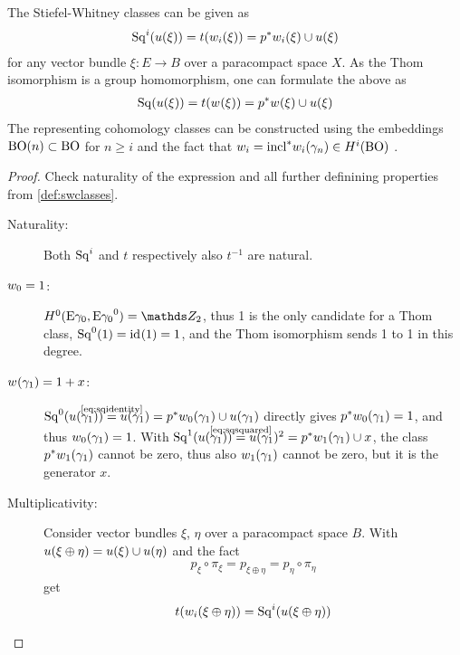 \begin{Thm}\label{thm:altdefswclasses}
  The Stiefel-Whitney classes can be given as
  \begin{gather*}
    \mathrm{Sq}^{i}({u}(\xi)) = t({w_{i}}(\xi)) = {p}^* {w_{i}}(\xi) \cup {u}(\xi)
  \end{gather*}
  for any vector bundle $\xi\colon E\to B$ over a paracompact space
  $X$. As the Thom isomorphism is a group homomorphism, one can
  formulate the above as
  \begin{gather*}
    \mathrm{Sq}({u}(\xi)) = t({w_{}}(\xi)) = {p}^* {w_{}}(\xi) \cup {u}(\xi)
  \end{gather*}
  The representing cohomology classes can be constructed using the
  embeddings $\mathrm{BO}(n)\subset\mathrm{BO}$ for $n\geq i$ and the fact that
  $w_{i}={\mathrm{incl}}^*{w_{i}}(\gamma_n)\in H^i(\mathrm{BO})$
  \cite[see \forexample][Theorem~7.1~ff.]{milnor}.
  \begin{proof}
    Check naturality of the expression and all further
    definining properties from \autoref{def:swclasses}.
    \begin{description}
    \item[Naturality:] Both $\mathrm{Sq}^{i}$ and $t$ respectively also $t^{-1}$
      are natural.
    \item[$w_{0}=1$:]
      $\H^0(\thomspacepair{\E{\gamma_0}}) = \Zmod2$, thus 1 is the only
      candidate for a Thom class, $\mathrm{Sq}^{0}(1) = \mathrm{id}_{}(1) = 1$, and the Thom
      isomorphism sends 1 to 1 in this degree.
    \item[${w_{}}(\gamma_1)=1+x$:]
      $\Sq 0(\u{\gamma_1})\cequalsby{\eqref{eq:sqidentity}}\u{\gamma_1}
      = \pb p\w{0}{\gamma_1}\cup\u{\gamma_1}$
      directly gives
      ${p}^*{w_{0}}(\gamma_1)=1$, and thus ${w_{0}}(\gamma_1)=1$.
      With
      $\Sq 1(\u{\gamma_1})\cequalsby{\eqref{eq:sqsquared}}\u{\gamma_1}^2
      =\pb p\w{1}{\gamma_1}\cup x$,
      the class ${p}^*{w_{1}}(\gamma_1)$ cannot be zero, thus also
      ${w_{1}}(\gamma_1)$ cannot be zero, but it is the generator $x$.
    \item[Multiplicativity:]
      Consider vector bundles $\xi$, $\eta$ over a paracompact space
      $B$. With ${u}(\xi\oplus\eta)={u}(\xi)\cup{u}(\eta)$ and the fact
      \begin{gather}\label{eq:projectionscommute}
        p_\xi\circ\pi_\xi = p_{\xi\oplus\eta} = p_\eta\circ\pi_\eta
      \end{gather}
      get
      \begin{align*}
        \thomiso(\w{i}{\xi\oplus\eta})
        &= \Sq i(\u{\xi\oplus\eta}) \\

\end{align*}
\end{description}
\end{proof}
\end{Thm}
